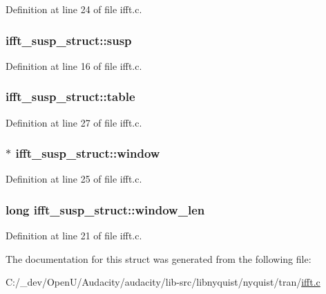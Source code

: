 Definition at line 24 of file ifft.\+c.

\subsubsection[{\texorpdfstring{susp}{susp}}]{ ifft\+\_\+susp\+\_\+struct\+::susp}\hypertarget{structifft__susp__struct_acb486f015843ecec7aa5411020613389}{}\label{structifft__susp__struct_acb486f015843ecec7aa5411020613389}


Definition at line 16 of file ifft.\+c.

\subsubsection[{\texorpdfstring{table}{table}}]{ ifft\+\_\+susp\+\_\+struct\+::table}\hypertarget{structifft__susp__struct_a03649ba177969d6ae7ada6ccee9e583d}{}\label{structifft__susp__struct_a03649ba177969d6ae7ada6ccee9e583d}


Definition at line 27 of file ifft.\+c.

\subsubsection[{\texorpdfstring{window}{window}}]{$\ast$ ifft\+\_\+susp\+\_\+struct\+::window}\hypertarget{structifft__susp__struct_a4af17d557b4dc005cffa1645bd4b3d4b}{}\label{structifft__susp__struct_a4af17d557b4dc005cffa1645bd4b3d4b}


Definition at line 25 of file ifft.\+c.

\subsubsection[{\texorpdfstring{window\+\_\+len}{window_len}}]{\setlength{\rightskip}{0pt plus 5cm}long ifft\+\_\+susp\+\_\+struct\+::window\+\_\+len}\hypertarget{structifft__susp__struct_adabf8f5013bd23e2c56f58ca9f6f74db}{}\label{structifft__susp__struct_adabf8f5013bd23e2c56f58ca9f6f74db}


Definition at line 21 of file ifft.\+c.



The documentation for this struct was generated from the following file\+:\begin{DoxyCompactItemize}
\item 
C\+:/\+\_\+dev/\+Open\+U/\+Audacity/audacity/lib-\/src/libnyquist/nyquist/tran/\hyperlink{ifft_8c}{ifft.\+c}\end{DoxyCompactItemize}
